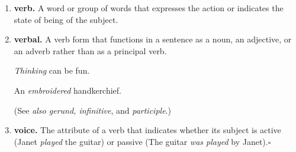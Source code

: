\documentclass{book}
\numberwithin{equation}{section}
\begin{document}
\begin{enumerate}
    My car \textit{blew} a gasket.
    \item \textbf{verb.} A word or group of words that expresses the action or indicates the state of being of the subject.
    
    \item \textbf{verbal.} A verb form that functions in a sentence as a noun, an adjective, or an adverb rather than as a principal verb.
    
    \textit{Thinking} can be fun.
    
    An \textit{embroidered} handkerchief.
    
    (See \textit{also gerund, infinitive}, and \textit{participle}.)
    \item \textbf{voice.} The attribute of a verb that indicates whether its subject is active (Janet \textit{played} the guitar) or passive (The guitar \textit{was played} by Janet).\hfill$\square$
\end{enumerate}


\printbibliography[heading=bibintoc]
\end{document}
